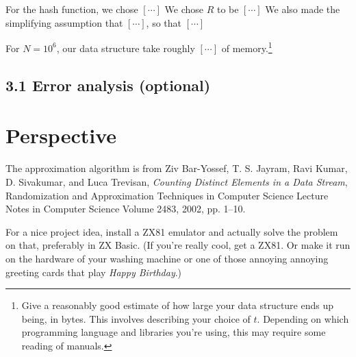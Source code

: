 \documentclass{tufte-handout}
\begin{document}
For the hash function, we chose $[\cdots]$ We chose $R$ to be $[\cdots]$
We also made the simplifying assumption that $[\cdots]$, so that $[\cdots]$

For $N=10^6$, our data structure take roughly $[\cdots]$ of memory.\footnote{Give a reasonably good estimate of how large your data structure ends up being, in bytes. 
This involves describing your choice of $t$.
Depending on which programming language and libraries you're using, this may require some reading of manuals.}

\subsection{3.1 Error analysis (optional)}





\newpage
\section{Perspective}

The approximation algorithm is from 
Ziv Bar-Yossef, T. S. Jayram, Ravi Kumar, D. Sivakumar, and Luca Trevisan,
{\em Counting Distinct Elements in a Data Stream}, 
Randomization and Approximation Techniques in Computer Science
Lecture Notes in Computer Science Volume 2483, 2002, pp. 1--10.

For a nice project idea, install a ZX81 emulator and actually solve
the problem on that, preferably in ZX Basic.
(If you're really cool, get a ZX81.
Or make it run on the hardware of your washing machine or one of those
annoying annoying greeting cards that play \emph{Happy Birthday}.)
\end{document}
